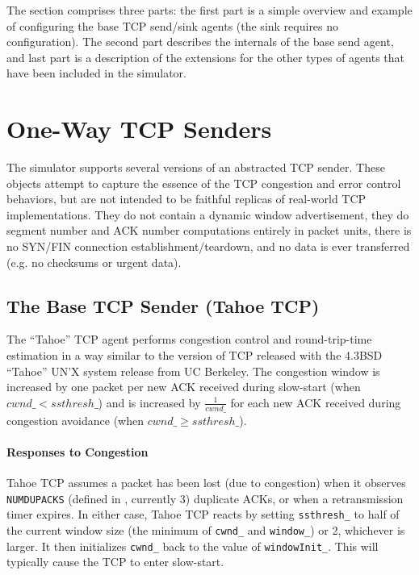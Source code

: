 The section comprises three parts:
the first part is a simple overview and example of configuring
the base TCP send/sink agents (the sink requires no configuration).
The second part describes the internals of the base send agent,
and last part is a description of the extensions
for the other types of agents that have been included in the
simulator.

\section{One-Way TCP Senders}
\label{sec:oneWayTcp}

The simulator supports several versions of an abstracted TCP sender.
These objects attempt to capture the essence of the TCP congestion
and error control behaviors, but are not intended to be faithful
replicas of real-world TCP implementations.
They do not contain a dynamic window advertisement, they do segment
number and ACK number computations entirely in packet units,
there is no SYN/FIN connection establishment/teardown, and no
data is ever transferred (e.g. no checksums or urgent data).

\subsection{The Base TCP Sender (Tahoe TCP)}
\label{sec:tahoetcp}

The ``Tahoe'' TCP agent  performs congestion
control and round-trip-time estimation
in a way similar to the version of TCP released with the
4.3BSD ``Tahoe'' UN'X system release from UC Berkeley.
The congestion window is increased by one packet per new ACK received
during slow-start (when $cwnd\_ < ssthresh\_$) and is increased
by $\frac{1}{cwnd\_}$ for each new ACK received during congestion avoidance
(when $cwnd\_ \geq ssthresh\_$).

\paragraph{Responses to Congestion}
Tahoe TCP assumes a packet has been lost (due to congestion)
when it observes {\tt NUMDUPACKS} (defined in , currently 3)
duplicate ACKs, or when a retransmission timer expires.
In either case, Tahoe TCP reacts by setting {\tt ssthresh\_} to half
of the current window size (the minimum of {\tt cwnd\_} and {\tt window\_})
or 2, whichever is larger.
It then initializes {\tt cwnd\_} back to the value of
{\tt windowInit\_}.  This will typically cause the TCP to
enter slow-start.

